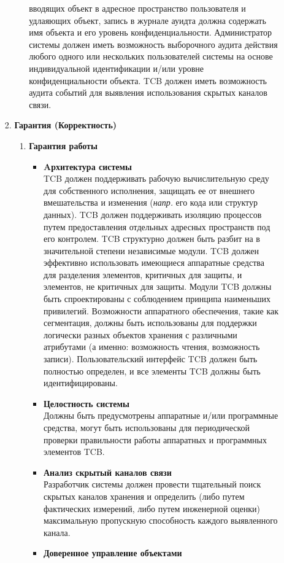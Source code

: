 \begin{enumerate}
\begin{enumerate}
\begin{enumerate}
\begin{enumerate}
				вводящих объект в адресное пространство пользователя и удлаяющих объект, запись в журнале ауидта должна содержать имя объекта и его уровень конфиденциальности. Администратор 
				системы должен иметь возможность выборочного аудита действия любого одного или нескольких пользователей системы на основе индивидуальной идентификации и/или уровне конфиденциальности объекта.
				TCB должен иметь возможность аудита событий для выявления использования скрытых каналов связи. 
			\end{enumerate}
			\item{\textbf{Гарантия (Корректность)}}
			\begin{enumerate}
				\item{\textbf{Гарантия работы}}
				\begin{itemize}
					\item{\textbf{Aрхитектура системы}}\\
					TCB должен поддерживать рабочую вычислительную среду для собственного исполнения, защищать ее от внешнего вмешательства и изменения  (\textit{напр.} его кода или структур данных).
					TCB должен поддерживать изоляцию процессов путем предоставления отдельных адресных пространств под его контролем. TCB структурно должен быть разбит на в значительной степени
					независимые модули. TCB должен эффективно использовать имеющиеся аппаратные средства для разделения элементов, критичных для защиты, и элементов, не критичных для защиты.
					Модули TCB должны быть спроектированы с соблюдением принципа наименьших привилегий. Возможности аппаратного обеспечения, такие как сегментация, должны быть использованы 
					для поддержки логически разных объектов хранения с различными атрибутами (а именно: возможность чтения, возможность записи). Пользовательский интерфейс TCB должен быть полностью 
					определен, и все элементы TCB должны быть идентифицированы.
					\item{\textbf{Целостность системы}}\\
					Должны быть предусмотрены аппаратные и/или программные средства, могут быть использованы для периодической проверки правильности работы аппаратных и программных элементов TCB.
					\item{\textbf{Анализ скрытый каналов связи}}\\
					Разработчик системы должен провести тщательный поиск скрытых каналов хранения и определить (либо путем фактических измерений, либо путем инженерной оценки)
					максимальную пропускную способность каждого выявленного канала.
					\item{\textbf{Доверенное управление объектами}}\\

\end{itemize}
\end{enumerate}
\end{enumerate}
\end{enumerate}
\end{enumerate}
